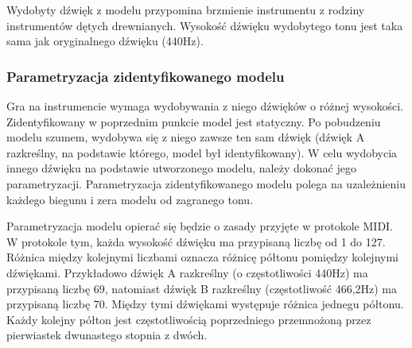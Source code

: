 Wydobyty dźwięk z modelu przypomina brzmienie instrumentu z rodziny instrumentów dętych drewnianych. Wysokość dźwięku wydobytego tonu jest taka sama jak oryginalnego dźwięku (440Hz).

\subsubsection{Parametryzacja zidentyfikowanego modelu}
Gra na instrumencie wymaga wydobywania z niego dźwięków o różnej wysokości. Zidentyfikowany w poprzednim punkcie model jest statyczny. Po pobudzeniu modelu szumem, wydobywa się z niego zawsze ten sam dźwięk (dźwięk A razkreślny, na podstawie którego, model był identyfikowany). W celu wydobycia innego dźwięku na podstawie utworzonego modelu, należy dokonać jego parametryzacji. Parametryzacja zidentyfikowanego modelu polega na uzależnieniu każdego biegunu i zera modelu od zagranego tonu.


Parametryzacja modelu opierać się będzie o zasady przyjęte w protokole MIDI. W protokole tym, każda wysokość dźwięku ma przypisaną liczbę od 1 do 127. Różnica między kolejnymi liczbami oznacza różnicę półtonu pomiędzy kolejnymi dźwiękami. Przykładowo dźwięk A razkreślny (o częstotliwości 440Hz) ma przypisaną liczbę 69, natomiast dźwięk B razkreślny (częstotliwość 466,2Hz) ma przypisaną liczbę 70. Między tymi dźwiękami występuje różnica jednegu półtonu. Każdy kolejny półton jest częstotliwością poprzedniego przemnożoną przez pierwiastek dwunastego stopnia z dwóch.


